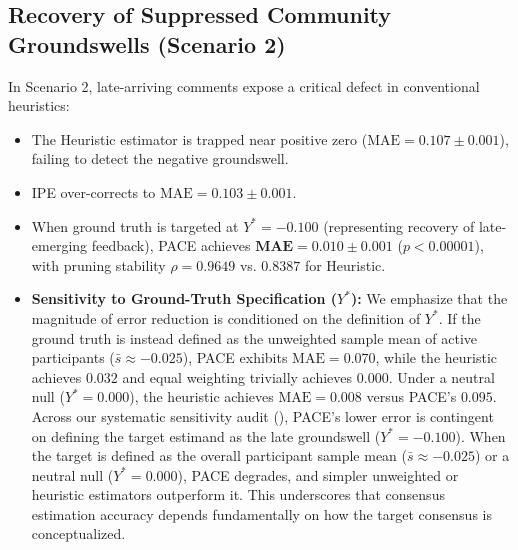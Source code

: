 \documentclass[journal]{IEEEtran}
\begin{document}
\subsection{Recovery of Suppressed Community Groundswells (Scenario 2)}
In Scenario 2, late-arriving comments expose a critical defect in conventional heuristics:
\begin{itemize}
    \item The Heuristic estimator is trapped near positive zero ($\text{MAE} = 0.107 \pm 0.001$), failing to detect the negative groundswell.
    \item IPE over-corrects to $\text{MAE} = 0.103 \pm 0.001$.
    \item When ground truth is targeted at $Y^* = -0.100$ (representing recovery of late-emerging feedback), PACE achieves $\mathbf{\text{MAE} = 0.010 \pm 0.001}$ ($p < 0.00001$), with pruning stability $\rho = 0.9649$ vs. $0.8387$ for Heuristic.
    \item \textbf{Sensitivity to Ground-Truth Specification ($Y^*$):} We emphasize that the magnitude of error reduction is conditioned on the definition of $Y^*$. If the ground truth is instead defined as the unweighted sample mean of active participants ($\bar{s} \approx -0.025$), PACE exhibits $\text{MAE} = 0.070$, while the heuristic achieves $0.032$ and equal weighting trivially achieves $0.000$. Under a neutral null ($Y^* = 0.000$), the heuristic achieves $\text{MAE} = 0.008$ versus PACE's $0.095$. Across our systematic sensitivity audit (), PACE's lower error is contingent on defining the target estimand as the late groundswell ($Y^* = -0.100$). When the target is defined as the overall participant sample mean ($\bar{s} \approx -0.025$) or a neutral null ($Y^* = 0.000$), PACE degrades, and simpler unweighted or heuristic estimators outperform it. This underscores that consensus estimation accuracy depends fundamentally on how the target consensus is conceptualized.
\end{itemize}
\end{document}

